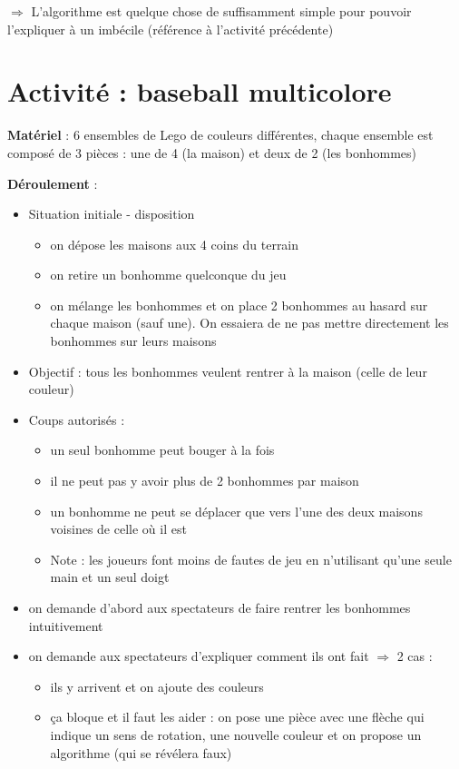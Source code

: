 \documentclass[a4paper]{article}
\newcommand{\titre}[1]{\medskip\noindent\textbf{#1} : }
\newcommand{\materiel}{\titre{Matériel}}
\newcommand{\deroulement}{\titre{Déroulement}}
\begin{document}
$\Rightarrow$ L'algorithme est quelque chose de suffisamment simple pour
pouvoir l'expliquer à un imbécile (référence à l'activité précédente)



\section{Activité : baseball multicolore}
\materiel 6 ensembles de Lego de couleurs différentes, chaque ensemble est composé de 3 pièces : une de 4 (la maison) et deux de 2 (les bonhommes)

\deroulement
\begin{itemize}
\item Situation initiale - disposition
\begin{itemize}
\item on dépose les maisons aux 4 coins du terrain
\item on retire un bonhomme quelconque du jeu
\item on mélange les bonhommes et on place 2 bonhommes au hasard sur chaque maison (sauf une). On essaiera de ne pas mettre directement les bonhommes sur leurs maisons
\end{itemize}
\item Objectif : tous les bonhommes veulent rentrer à la maison (celle de leur couleur)
\item Coups autorisés :
\begin{itemize}
\item un seul bonhomme peut bouger à la fois
\item il ne peut pas y avoir plus de 2 bonhommes par maison
\item un bonhomme ne peut se déplacer que vers l'une des deux maisons voisines de celle où il est
\item Note : les joueurs font moins de fautes de jeu en n'utilisant qu'une seule main et un seul doigt
\end{itemize}
\item on demande d'abord aux spectateurs de faire rentrer les bonhommes intuitivement
\item on demande aux spectateurs d'expliquer comment ils ont fait $\Rightarrow$ 2 cas :
\begin{itemize}
\item ils y arrivent et on ajoute des couleurs
\item ça bloque et il faut les aider : on pose une pièce avec une flèche qui indique un sens de rotation, une nouvelle couleur et on propose un algorithme (qui se révélera faux)

\end{itemize}
\end{itemize}
\end{document}
